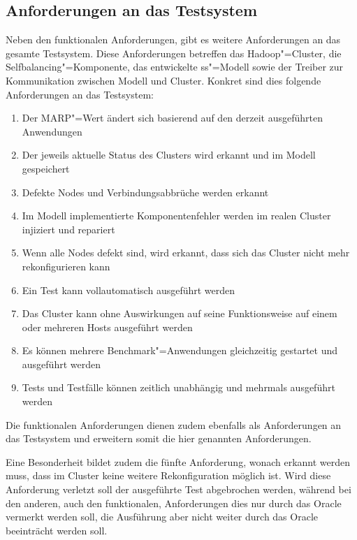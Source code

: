 \subsection{Anforderungen an das Testsystem}
\label{subsec:testRequirements}

Neben den funktionalen Anforderungen, gibt es weitere Anforderungen an das gesamte Testsystem.
Diese Anforderungen betreffen das Hadoop"=Cluster, die Selfbalancing"=Komponente, das entwickelte \ac{ss}"=Modell sowie der Treiber zur Kommunikation zwischen Modell und Cluster.
Konkret sind dies folgende Anforderungen an das Testsystem:

\begin{enumerate}
    \item Der \ac{MARP}"=Wert ändert sich basierend auf den derzeit ausgeführten Anwendungen
    \item Der jeweils aktuelle Status des Clusters wird erkannt und im Modell gespeichert
    \item Defekte Nodes und Verbindungsabbrüche werden erkannt
    \item Im Modell implementierte Komponentenfehler werden im realen Cluster injiziert und repariert
    \item Wenn alle Nodes defekt sind, wird erkannt, dass sich das Cluster nicht mehr rekonfigurieren kann
    \item Ein Test kann vollautomatisch ausgeführt werden
    \item Das Cluster kann ohne Auswirkungen auf seine Funktionsweise auf einem oder mehreren Hosts ausgeführt werden
    \item Es können mehrere Benchmark"=Anwendungen gleichzeitig gestartet und ausgeführt werden
    \item Tests und Testfälle können zeitlich unabhängig und mehrmals ausgeführt werden
\end{enumerate}

Die funktionalen Anforderungen dienen zudem ebenfalls als Anforderungen an das Testsystem und erweitern somit die hier genannten Anforderungen.

Eine Besonderheit bildet zudem die fünfte Anforderung, wonach erkannt werden muss, dass im Cluster keine weitere Rekonfiguration möglich ist.
Wird diese Anforderung verletzt soll der ausgeführte Test abgebrochen werden, während bei den anderen, auch den funktionalen, Anforderungen dies nur durch das Oracle vermerkt werden soll, die Ausführung aber nicht weiter durch das Oracle beeinträcht werden soll.
